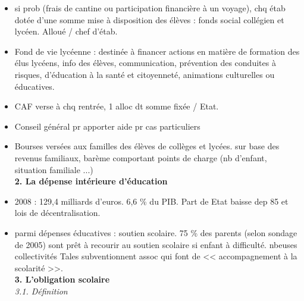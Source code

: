 \documentclass[12pt]{article}
\begin{document}
\begin{itemize}
\vspace{0.5cm}

\item si prob (frais de cantine ou participation financière à un voyage), chq étab dotée d'une somme mise à disposition des élèves : fonds social collégien et lycéen. Alloué /  chef d'étab.\\

\item Fond de vie lycéenne : destinée à financer actions en matière de formation des élus lycéens, info des élèves, communication, prévention des conduites à risques, d'éducation à la santé et citoyenneté, animations culturelles ou éducatives.\\

\item CAF verse à chq rentrée, 1 alloc dt somme fixée / Etat. \\

\item Conseil général pr apporter aide pr cas particuliers \\

\item Bourses versées aux familles des élèves de collèges et lycées. sur base des revenus familiaux, barème comportant points de charge (nb d'enfant, situation familiale ...) \\

\textbf{2. La dépense intérieure d'éducation} \\

\item 2008 : 129,4 milliards d'euros. 6,6 \% du PIB. Part de Etat baisse dep 85 et lois de décentralisation. \\

\item parmi dépenses éducatives : soutien scolaire. 75 \% des parents (selon sondage de 2005) sont prêt à recourir au soutien scolaire si enfant à difficulté. nbeuses collectivités Tales subventionnent assoc qui font de << accompagnement à la scolarité >>. \\

\textbf{3. L'obligation scolaire} \\

\textit{3.1. Définition} \\

\end{itemize}
\end{document}
